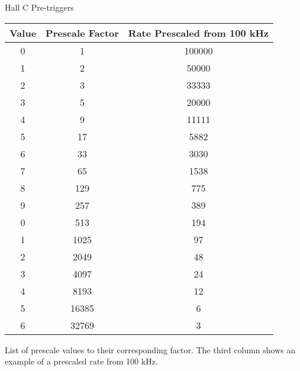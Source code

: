 \begin{Mtable}{Hall C Pre-triggers}
  \centering
  \begin{tabular}{|c|c|c|}
    \hline
    \textbf{Value} & \textbf{Prescale Factor} & \textbf{Rate Prescaled from 100 kHz} \\
    \hline    
    0   &        1 & 100000 \\
    1   &        2 & 50000 \\
    2   &        3 & 33333 \\
    3   &        5 & 20000 \\
    4   &        9 & 11111 \\
    5   &       17 & 5882 \\
    6   &       33 & 3030 \\
    7   &       65 & 1538 \\
    8   &      129 & 775 \\
    9   &      257 & 389 \\
    0   &      513 & 194 \\
    1   &     1025 & 97 \\
    2   &     2049 & 48 \\
    3   &     4097 & 24 \\
    4   &     8193 & 12 \\
    5   &    16385 & 6 \\
    6   &    32769 & 3 \\
    \hline
  \end{tabular}
  \caption{List of prescale values to their corresponding factor. The third column shows an example of a prescaled rate from 100 kHz.}
  \label{tab:2-5_prescale}
\end{Mtable}

